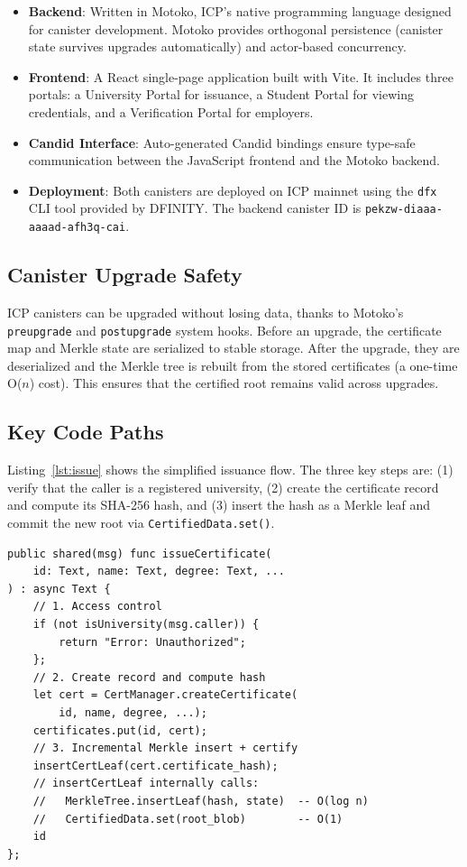 \documentclass[journal]{IEEEtran}
\begin{document}
\begin{itemize}[leftmargin=*]
  \item \textbf{Backend}: Written in Motoko, ICP's native programming language designed for canister development. Motoko provides orthogonal persistence (canister state survives upgrades automatically) and actor-based concurrency.
  \item \textbf{Frontend}: A React single-page application built with Vite. It includes three portals: a University Portal for issuance, a Student Portal for viewing credentials, and a Verification Portal for employers.
  \item \textbf{Candid Interface}: Auto-generated Candid bindings ensure type-safe communication between the JavaScript frontend and the Motoko backend.
  \item \textbf{Deployment}: Both canisters are deployed on ICP mainnet using the \texttt{dfx} CLI tool provided by DFINITY. The backend canister ID is \texttt{pekzw-diaaa-aaaad-afh3q-cai}.
\end{itemize}

\subsection{Canister Upgrade Safety}

ICP canisters can be upgraded without losing data, thanks to Motoko's \texttt{preupgrade} and \texttt{postupgrade} system hooks. Before an upgrade, the certificate map and Merkle state are serialized to stable storage. After the upgrade, they are deserialized and the Merkle tree is rebuilt from the stored certificates (a one-time O($n$) cost). This ensures that the certified root remains valid across upgrades.

\subsection{Key Code Paths}

Listing~\ref{lst:issue} shows the simplified issuance flow. The three key steps are: (1) verify that the caller is a registered university, (2) create the certificate record and compute its SHA-256 hash, and (3) insert the hash as a Merkle leaf and commit the new root via \texttt{CertifiedData.set()}.

\begin{lstlisting}[caption={Simplified issuance flow in Motoko},label={lst:issue},language={}]
public shared(msg) func issueCertificate(
    id: Text, name: Text, degree: Text, ...
) : async Text {
    // 1. Access control
    if (not isUniversity(msg.caller)) {
        return "Error: Unauthorized";
    };
    // 2. Create record and compute hash
    let cert = CertManager.createCertificate(
        id, name, degree, ...);
    certificates.put(id, cert);
    // 3. Incremental Merkle insert + certify
    insertCertLeaf(cert.certificate_hash);
    // insertCertLeaf internally calls:
    //   MerkleTree.insertLeaf(hash, state)  -- O(log n)
    //   CertifiedData.set(root_blob)        -- O(1)
    id
};
\end{lstlisting}
\end{document}
